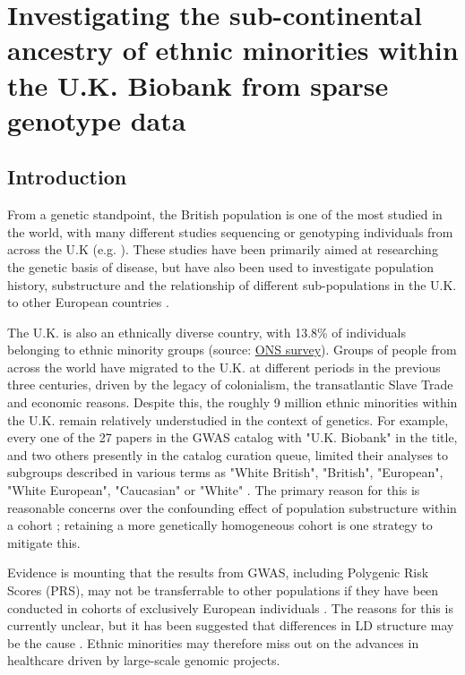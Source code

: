 \chapter{Investigating the sub-continental ancestry of ethnic minorities within the U.K. Biobank from sparse genotype data}
\label{chapterlabel3}

\section{Introduction}

From a genetic standpoint, the British population is one of the most studied in the world, with many different studies sequencing or genotyping individuals from across the U.K (e.g. \cite{bycroft2018UK, Leslie2015, turnbull2018introducing, UK10k2015UK10k}). These studies have been primarily aimed at researching the genetic basis of disease, but have also been used to investigate population history, substructure  and the relationship of different sub-populations in the U.K. to other European countries \cite{Leslie2015, schiffels2016iron, liu2020human}.  

The U.K. is also an ethnically diverse country, with 13.8\% of individuals belonging to ethnic minority groups (source: \href{https://www.ons.gov.U.K./peoplepopulationandcommunity/populationandmigration/populationestimates/articles/researchreportonpopulationestimatesbyethnicgroupandreligion/2019-12-04}{ONS survey}). Groups of people from across the world have migrated to the U.K. at different periods in the previous three centuries, driven by the legacy of colonialism, the transatlantic Slave Trade and economic reasons. Despite this, the roughly 9 million ethnic minorities within the U.K. remain relatively understudied in the context of genetics. For example, every one of the 27 papers in the GWAS catalog with "U.K. Biobank" in the title, and two others presently in the catalog curation queue, limited their analyses to subgroups described in various terms as "White British", "British", "European", "White European", "Caucasian" or "White" \cite{manolio2019using}. The primary reason for this is reasonable concerns over the confounding effect of population substructure within a cohort \cite{hellwege2017population}; retaining a more genetically homogeneous cohort is one strategy to mitigate this. 

Evidence is mounting that the results from GWAS, including Polygenic Risk Scores (PRS), may not be transferrable to other populations if they have been conducted in cohorts of exclusively European individuals \cite{kuchenbaecker2019transferability, martin2017human, bustamante2011genomics}. The reasons for this is currently unclear, but it has been suggested that differences in LD structure may be the cause \cite{vilhjalmsson2015modeling}. Ethnic minorities may therefore miss out on the advances in healthcare driven by large-scale genomic projects. 

